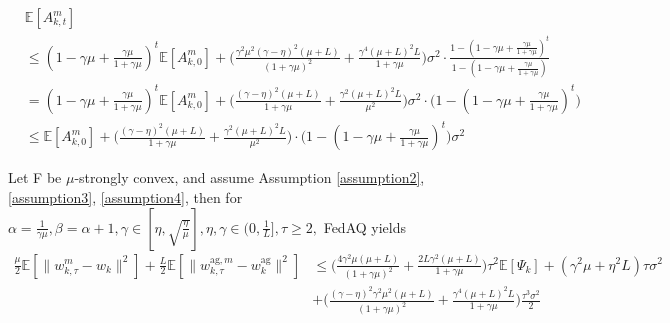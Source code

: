 \documentclass[11pt]{article}
\begin{document}
\begin{align*}
    &\mathbb{E}[A_{k, t}^m] \\
    &\leq (1-\gamma\mu+\frac{\gamma\mu}{1+\gamma\mu})^t\mathbb{E}[A_{k, 0}^m] + \Big(\frac{\gamma^2\mu^2(\gamma-\eta)^2(\mu+L)}{(1+\gamma\mu)^2} + \frac{\gamma^4(\mu+L)^2 L}{1+\gamma\mu}\Big)\sigma^2 \cdot \frac{1-(1-\gamma\mu+\frac{\gamma\mu}{1+\gamma\mu})^t}{1-(1-\gamma\mu+\frac{\gamma\mu}{1+\gamma\mu})} \\
    &= (1-\gamma\mu+\frac{\gamma\mu}{1+\gamma\mu})^t\mathbb{E}[A_{k, 0}^m] + \Big( \frac{(\gamma-\eta)^2(\mu+L)}{1+\gamma\mu}+\frac{\gamma^2(\mu+L)^2 L}{\mu^2}\Big)\sigma^2 \cdot \Big(1-(1-\gamma\mu+\frac{\gamma\mu}{1+\gamma\mu})^t\Big) \\
    &\leq \mathbb{E}[A_{k, 0}^m] + \Big( \frac{(\gamma-\eta)^2(\mu+L)}{1+\gamma\mu}+\frac{\gamma^2(\mu+L)^2 L}{\mu^2}\Big)\cdot \Big( 1-(1-\gamma\mu+\frac{\gamma\mu}{1+\gamma\mu})^t\Big)\sigma^2
\end{align*}

\begin{proposition} \label{proposition3.6}
Let F be $\mu$-strongly convex, and assume Assumption \ref{assumption2}, \ref{assumption3}, \ref{assumption4}, then for $\alpha=\frac{1}{\gamma\mu}, \beta=\alpha+1, \gamma \in [\eta, \sqrt{\frac{\eta}{\mu}}], \eta, \gamma \in (0, \frac{1}{L}], \tau \geq 2,$ FedAQ yields
\begin{align*}
    \frac{\mu}{2}\mathbb{E}[\|w_{k, \tau}^m - w_k\|^2] + \frac{L}{2} \mathbb{E}[\|w_{k, \tau}^{\textrm{ag}, m} - w_k^{\textrm{ag}}\|^2] &\leq \Big( \frac{4\gamma^2\mu(\mu+L)}{(1+\gamma\mu)^2} + \frac{2L\gamma^2(\mu+L)}{1+\gamma\mu}\Big)\tau^2 \mathbb{E}[\Psi_k] + (\gamma^2\mu+\eta^2 L)\tau\sigma^2 \\
    &+ \Big( \frac{(\gamma-\eta)^2\gamma^2\mu^2(\mu+L)}{(1+\gamma\mu)^2} + \frac{\gamma^4(\mu+L)^2 L}{1+\gamma\mu} \Big) \frac{\tau^3\sigma^2}{2}
\end{align*}
\end{proposition}
\end{document}
